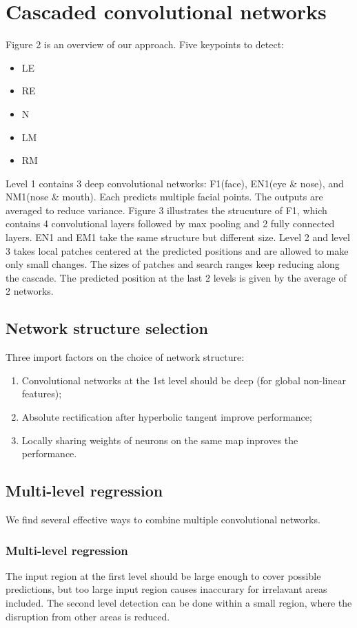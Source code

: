 \section{Cascaded convolutional networks}
Figure 2 is an overview of our approach. Five keypoints to detect:
\begin{itemize}
	\item LE
	\item RE
	\item N
	\item LM
	\item RM
\end{itemize}

Level 1 contains 3 deep convolutional networks: F1(face), EN1(eye \& nose), and NM1(nose \& mouth).
Each predicts multiple facial points. The outputs are averaged to reduce variance. Figure 3
illustrates the strucuture of F1, which contains 4 convolutional layers followed by max pooling and
2 fully connected layers. EN1 and EM1 take the same structure but different size. Level 2 and level
3 takes local patches centered at the predicted positions and are allowed to make only small
changes. The sizes of patches and search ranges keep reducing along the cascade. The predicted
position at the last 2 levels is given by the average of 2 networks.

\subsection{Network structure selection}
Three import factors on the choice of network structure:
\begin{enumerate}
	\item Convolutional networks at the 1st level should be deep (for global non-linear features);
	\item Absolute rectification after hyperbolic tangent improve performance;
	\item Locally sharing weights of neurons on the same map inproves the performance.
\end{enumerate}

\subsection{Multi-level regression}
We find several effective ways to combine multiple convolutional networks.

\subsubsection{Multi-level regression}
The input region at the first level should be large enough to cover possible predictions, but too
large input region causes inaccurary for irrelavant areas included. The second level detection can
be done within a small region, where the disruption from other areas is reduced.

